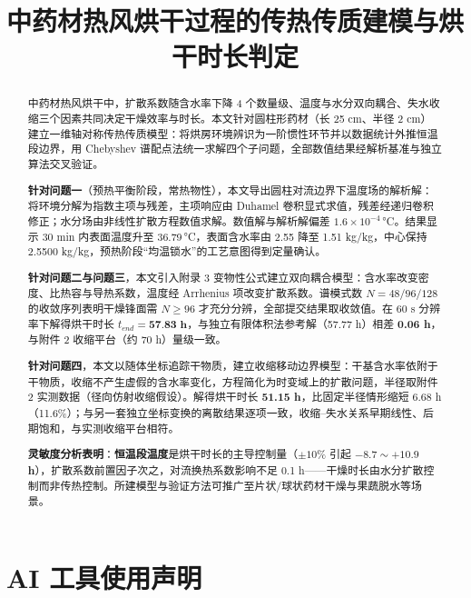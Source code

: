 \documentclass{cumcmthesis}
\title{中药材热风烘干过程的传热传质建模与烘干时长判定}
\begin{document}
\maketitle

\begin{abstract}
中药材热风烘干中，扩散系数随含水率下降 4 个数量级、温度与水分双向耦合、失水收缩三个因素共同决定干燥效率与时长。本文针对圆柱形药材（长 25 cm、半径 2 cm）建立一维轴对称传热传质模型：将烘房环境辨识为一阶惯性环节并以数据统计外推恒温段边界，用 Chebyshev 谱配点法统一求解四个子问题，全部数值结果经解析基准与独立算法交叉验证。

\textbf{针对问题一}（预热平衡阶段，常热物性），本文导出圆柱对流边界下温度场的解析解：将环境分解为指数主项与残差，主项响应由 Duhamel 卷积显式求值，残差经递归卷积修正；水分场由非线性扩散方程数值求解。数值解与解析解偏差 $1.6\times10^{-4}$\,°C。结果显示 30 min 内表面温度升至 36.79\,°C，表面含水率由 2.55 降至 1.51 kg/kg，中心保持 2.5500 kg/kg，预热阶段“均温锁水”的工艺意图得到定量确认。

\textbf{针对问题二与问题三}，本文引入附录 3 变物性公式建立双向耦合模型：含水率改变密度、比热容与导热系数，温度经 Arrhenius 项改变扩散系数。谱模式数 $N=48/96/128$ 的收敛序列表明干燥锋面需 $N\ge96$ 才充分分辨，全部提交结果取收敛值。在 60 s 分辨率下解得烘干时长 $t_{end}=\textbf{57.83\ h}$，与独立有限体积法参考解（57.77 h）相差 \textbf{0.06 h}，与附件 2 收缩平台（约 70 h）量级一致。

\textbf{针对问题四}，本文以随体坐标追踪干物质，建立收缩移动边界模型：干基含水率依附于干物质，收缩不产生虚假的含水率变化，方程简化为时变域上的扩散问题，半径取附件 2 实测数据（径向仿射收缩假设）。解得烘干时长 \textbf{51.15 h}，比固定半径情形缩短 6.68 h（11.6\%）；与另一套独立坐标变换的离散结果逐项一致，收缩--失水关系早期线性、后期饱和，与实测收缩平台相符。

\textbf{灵敏度分析表明}：\textbf{恒温段温度}是烘干时长的主导控制量（$\pm10\%$ 引起 \textbf{$-8.7\sim+10.9$ h}），扩散系数前置因子次之，对流换热系数影响不足 0.1 h——干燥时长由水分扩散控制而非传热控制。所建模型与验证方法可推广至片状/球状药材干燥与果蔬脱水等场景。

\end{abstract}








\section{AI 工具使用声明}
\end{document}
